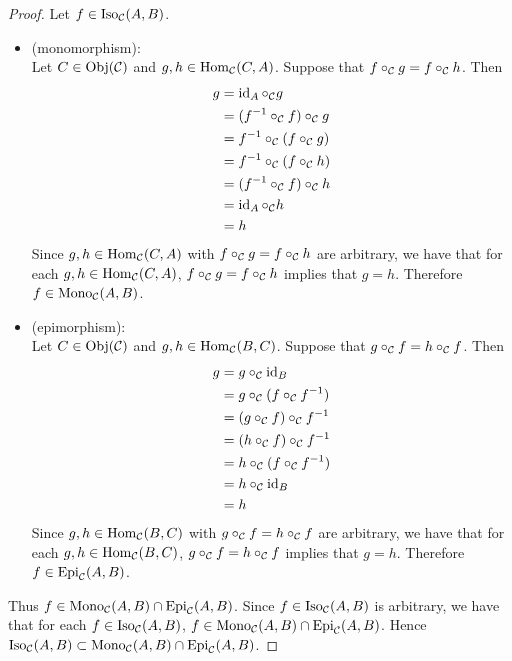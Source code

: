 \documentclass{book}
\begin{document}
	\begin{proof}
		Let $f \in \operatorname{Iso}_{\mathcal{C}}(A, B)$. 
		\begin{itemize}
			\item (monomorphism): \\
			Let $C \in \operatorname{Obj}(\mathcal{C})$ and $g, h \in \operatorname{Hom}_{\mathcal{C}}(C, A)$. Suppose that $f \circ_{\mathcal{C}} g = f \circ_{\mathcal{C}} h$. Then
			\begin{align*}
				g 
				& = \operatorname{id}_A \circ_{\mathcal{C}} g \\
				& = (f^{-1} \circ_{\mathcal{C}} f) \circ_{\mathcal{C}} g \\
				& = f^{-1} \circ_{\mathcal{C}} (f \circ_{\mathcal{C}} g) \\
				& = f^{-1} \circ_{\mathcal{C}} (f \circ_{\mathcal{C}} h) \\
				& = (f^{-1} \circ_{\mathcal{C}} f) \circ_{\mathcal{C}} h \\
				& = \operatorname{id}_A \circ_{\mathcal{C}} h \\
				& = h
			\end{align*}
			Since $g, h \in \operatorname{Hom}_{\mathcal{C}}(C, A)$ with $f \circ_{\mathcal{C}} g = f \circ_{\mathcal{C}} h$ are arbitrary, we have that for each $g, h \in \operatorname{Hom}_{\mathcal{C}}(C, A)$, $f \circ_{\mathcal{C}} g = f \circ_{\mathcal{C}} h$ implies that $g = h$. Therefore $f \in \operatorname{Mono}_{\mathcal{C}}(A, B)$.
			\item  (epimorphism): \\
			Let $C \in \operatorname{Obj}(\mathcal{C})$ and $g, h \in \operatorname{Hom}_{\mathcal{C}}(B, C)$. Suppose that $ g \circ_{\mathcal{C}} f = h \circ_{\mathcal{C}} f$. Then
			\begin{align*}
				g 
				& = g \circ_{\mathcal{C}} \operatorname{id}_B \\
				& = g \circ_{\mathcal{C}} (f \circ_{\mathcal{C}} f^{-1}) \\
				& = (g \circ_{\mathcal{C}} f) \circ_{\mathcal{C}} f^{-1} \\
				& = (h \circ_{\mathcal{C}} f) \circ_{\mathcal{C}} f^{-1} \\
				& = h \circ_{\mathcal{C}} (f \circ_{\mathcal{C}} f^{-1}) \\
				& = h \circ_{\mathcal{C}} \operatorname{id}_B \\
				& = h
			\end{align*}
			Since $g, h \in \operatorname{Hom}_{\mathcal{C}}(B, C)$ with $g \circ_{\mathcal{C}} f = h \circ_{\mathcal{C}} f$ are arbitrary, we have that for each $g, h \in \operatorname{Hom}_{\mathcal{C}}(B, C)$, $g \circ_{\mathcal{C}} f = h \circ_{\mathcal{C}} f$ implies that $g = h$. Therefore $f \in \operatorname{Epi}_{\mathcal{C}}(A, B)$. 
		\end{itemize}
		Thus $f \in \operatorname{Mono}_{\mathcal{C}}(A, B) \cap \operatorname{Epi}_{\mathcal{C}}(A, B)$. Since $f \in \operatorname{Iso}_{\mathcal{C}}(A, B)$ is arbitrary, we have that for each $f \in \operatorname{Iso}_{\mathcal{C}}(A, B)$, $f \in \operatorname{Mono}_{\mathcal{C}}(A, B) \cap \operatorname{Epi}_{\mathcal{C}}(A, B)$. Hence $\operatorname{Iso}_{\mathcal{C}}(A, B) \subset \operatorname{Mono}_{\mathcal{C}}(A, B) \cap \operatorname{Epi}_{\mathcal{C}}(A, B)$.
	\end{proof}
	
\end{document}
